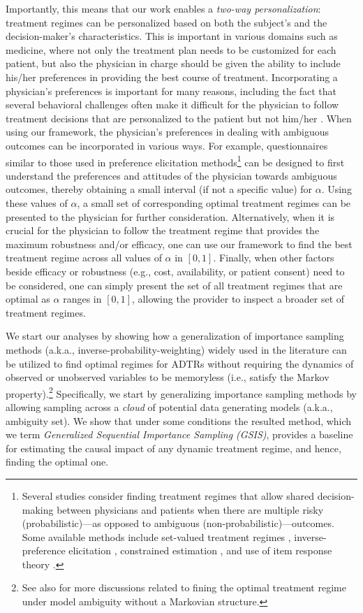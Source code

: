 \documentclass[opre,nonblindrev]{informs2}%
\newcommand{\1}{\hbox{\rm 1\kern-.35em 1}}
\begin{document}
Importantly, this means that our work enables a {\em two-way personalization}: treatment regimes can be personalized based on both the subject's and the decision-maker's characteristics. This is important in various domains such as medicine, where
not only the treatment plan needs to be customized for each patient, but also the physician in charge should be given the ability to include his/her preferences in providing the best course of treatment. Incorporating a physician's preferences is important for many  reasons, including the fact that several behavioral challenges often make it difficult for the physician to follow treatment decisions that are personalized to the patient but not him/her \citep[see, e.g.,][]{Frank2007}.  When using our framework, the physician's preferences in dealing with ambiguous outcomes can be incorporated in various ways. For example, questionnaires similar to those used in preference elicitation methods\footnote{Several studies consider finding treatment regimes that allow shared decision-making between physicians and patients when there are multiple risky (probabilistic)---as opposed to ambiguous (non-probabilistic)---outcomes. Some available methods include set-valued treatment regimes \citep{Laber2014,Lizotte2016}, inverse-preference elicitation \citep{Lizotte2012}, constrained estimation \citep{Linn2015}, and use of item response theory \citep{Butler2018}.} can be designed to first understand the preferences and attitudes of the physician towards ambiguous outcomes, thereby obtaining a small interval (if not a specific value) for  $\alpha$. Using these values of $\alpha$, a small set of corresponding optimal treatment regimes can be presented to the physician for further consideration.  Alternatively, when it is crucial for the physician to follow the treatment regime that provides the maximum robustness and/or efficacy, one can use our framework to find the best treatment regime across all values of $\alpha$ in $[0,1]$. Finally, when other factors beside efficacy or robustness (e.g., cost, availability, or patient consent) need to be considered, one can simply present the set of all treatment regimes that are optimal as $\alpha$ ranges in $[0,1]$, allowing the provider to inspect a broader set of treatment regimes.



 We start our analyses by showing how a generalization of importance sampling methods (a.k.a., inverse-probability-weighting) widely used in the literature \citep[see, e.g.,][]{Robins2000, Precup2000, Murphy2005, Tsiatis2019} can be utilized to find optimal regimes for ADTRs without requiring the dynamics of observed or unobserved variables to be memoryless (i.e., satisfy the Markov property).\footnote{See also \cite{Zhang2019} for more discussions related to fining the optimal treatment regime under model ambiguity without a Markovian structure.} Specifically, we start by generalizing importance sampling methods by allowing sampling across a {\em cloud} of potential data generating models (a.k.a., ambiguity set). We show that under some conditions the resulted method, which we term {\em Generalized Sequential Importance Sampling (GSIS)}, provides a baseline for estimating the causal impact of any dynamic treatment regime, and hence, finding the optimal one.
\end{document}
